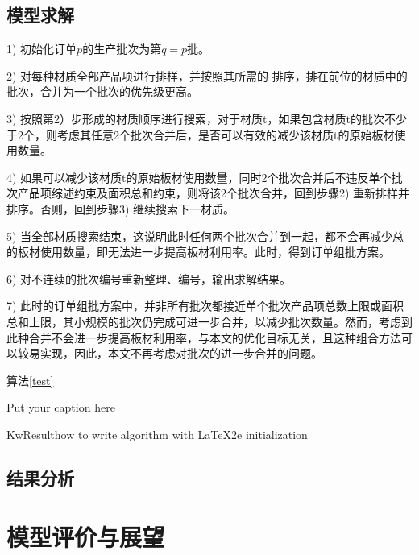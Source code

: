 \documentclass[bwprint]{gmcmthesis}
\begin{document}
\subsection{模型求解}
1) 初始化订单$p$的生产批次为第$q=p$批。

2) 对每种材质全部产品项进行排样，并按照其所需的  排序，排在前位的材质中的批次，合并为一个批次的优先级更高。

3) 按照第2）步形成的材质顺序进行搜索，对于材质t，如果包含材质t的批次不少于2个，则考虑其任意2个批次合并后，是否可以有效的减少该材质t的原始板材使用数量。

4) 如果可以减少该材质t的原始板材使用数量，同时2个批次合并后不违反单个批次产品项综述约束及面积总和约束，则将该2个批次合并，回到步骤2) 重新排样并排序。否则，回到步骤3) 继续搜索下一材质。

5) 当全部材质搜索结束，这说明此时任何两个批次合并到一起，都不会再减少总的板材使用数量，即无法进一步提高板材利用率。此时，得到订单组批方案。

6) 对不连续的批次编号重新整理、编号，输出求解结果。

7) 此时的订单组批方案中，并非所有批次都接近单个批次产品项总数上限或面积总和上限，其小规模的批次仍完成可进一步合并，以减少批次数量。然而，考虑到此种合并不会进一步提高板材利用率，与本文的优化目标无关，且这种组合方法可以较易实现，因此，本文不再考虑对批次的进一步合并的问题。

算法\ref{test}
\begin{algorithm}
    \caption{Put your caption here}\label{test}
    \begin{multicols}{2}
        \SetAlgoLined
        KwResult{how to write algorithm with \LaTeX2e }
        initialization\;
    \end{multicols}
\end{algorithm}

\subsection{结果分析}

\section{模型评价与展望}


\newpage
\quad
\newpage
\end{document}
